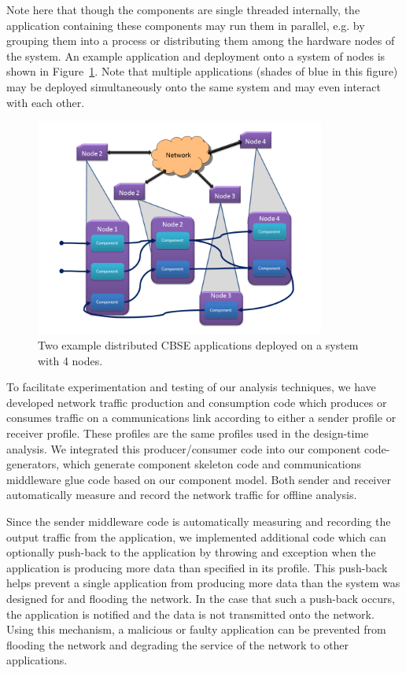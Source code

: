 Note here that though the components are single threaded internally,
the application containing these components may run them in parallel,
e.g. by grouping them into a process or distributing them among the
hardware nodes of the system.  An example application and deployment
onto a system of nodes is shown in Figure~\ref{fig:cbse}.  Note that
multiple applications (shades of blue in this figure) may be deployed
simultaneously onto the same system and may even interact with each
other.

\begin{figure}[ht!]
  \centering
  \includegraphics[width=0.85\textwidth]{../doc/src/images/results/cbse.png}
  \caption{Two example distributed CBSE applications deployed on a system with
    4 nodes.}
  \label{fig:cbse}
\end{figure}
   
To facilitate experimentation and testing of our analysis techniques,
we have developed network traffic production and consumption code
which produces or consumes traffic on a communications link according
to either a sender profile or receiver profile.  These profiles are
the same profiles used in the design-time analysis.  We integrated
this producer/consumer code into our component code-generators, which
generate component skeleton code and communications middleware glue
code based on our component model.  Both sender and receiver
automatically measure and record the network traffic for offline
analysis.

Since the sender middleware code is automatically measuring and
recording the output traffic from the application, we implemented
additional code which can optionally push-back to the application by
throwing and exception when the application is producing more data
than specified in its profile.  This push-back helps prevent a single
application from producing more data than the system was designed for
and flooding the network.  In the case that such a push-back occurs,
the application is notified and the data is not transmitted onto the
network.  Using this mechanism, a malicious or faulty application can
be prevented from flooding the network and degrading the service of
the network to other applications.

